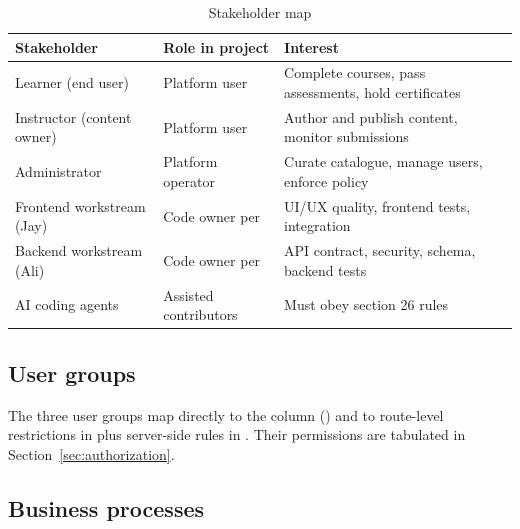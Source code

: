 \begin{table}[H]
\centering
\caption{Stakeholder map}
\label{tab:stakeholders}
\begin{tabular}{@{}L{3.6cm}L{4.4cm}L{5.6cm}@{}}
\toprule
\textbf{Stakeholder} & \textbf{Role in project} & \textbf{Interest} \\
\midrule
Learner (end user) & Platform user & Complete courses, pass assessments, hold certificates \\
Instructor (content owner) & Platform user & Author and publish content, monitor submissions \\
Administrator & Platform operator & Curate catalogue, manage users, enforce policy \\
Frontend workstream (Jay) & Code owner per  & UI/UX quality, frontend tests, integration \\
Backend workstream (Ali) & Code owner per  & API contract, security, schema, backend tests \\
AI coding agents & Assisted contributors & Must obey  section 26 rules \\
\bottomrule
\end{tabular}
\end{table}

\subsection{User groups}

The three user groups map directly to the  column () and to route-level restrictions in  plus server-side rules in . Their permissions are tabulated in Section~\ref{sec:authorization}.

\subsection{Business processes}

